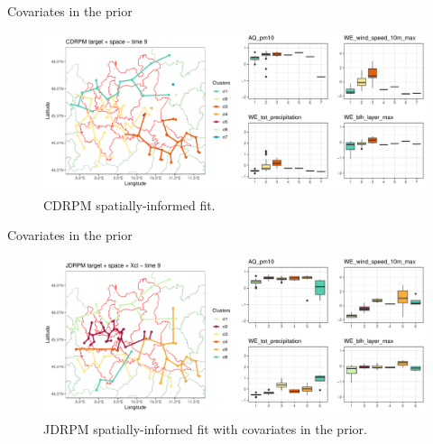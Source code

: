 \documentclass[
	11pt, %
 xcolor={dvipsnames,svgnames}
]{beamer}
\begin{document}
\begin{frame}{Covariates in the prior}
    \begin{figure}[!ht]
    \centering
    \includegraphics[width=1\linewidth]{Testing/Covariates/in clustering/space C/CDRPM target + space_t09.pdf}
    \caption{CDRPM spatially-informed fit.}
    \label{fig: summary fits battle}
\end{figure}
\end{frame}
\begin{frame}{Covariates in the prior}
    \begin{figure}[!ht]
    \centering
     \includegraphics[width=1\linewidth]{Testing/Covariates/in clustering/space J Xcl/JDRPM target + space + Xcl_t09.pdf}
     \caption{JDRPM spatially-informed fit with covariates in the prior.}
    \label{fig: summary fits battle}
\end{figure}
\end{frame}
\end{document}

